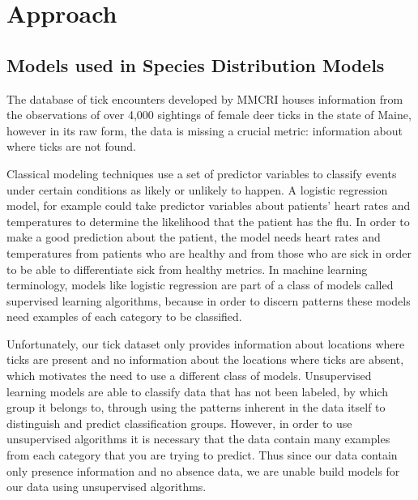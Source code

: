
\chapter{Approach} %

\label{Chapter2} 



\section{Models used in Species Distribution Models}
\noindent The database of tick encounters developed by MMCRI houses information from the observations of over 4,000 sightings of female deer ticks in the state of Maine, however in its raw form, the data is missing a crucial metric: information about where ticks are not found. \newline

\noindent Classical modeling techniques use a set of predictor variables to classify events under certain conditions as likely or unlikely to happen. A logistic regression model, for example could take predictor variables about patients' heart rates and temperatures to determine the likelihood that the patient has the flu. In order to make a good prediction about the patient, the model needs heart rates and temperatures from patients who are healthy and from those who are sick in order to be able to differentiate sick from healthy metrics. In machine learning terminology, models like logistic regression are part of a class of models called supervised learning algorithms, because in order to discern patterns these models need examples of each category to be classified. \newline

\noindent Unfortunately, our tick dataset only provides information about locations where ticks are present and no information about the locations where ticks are absent, which motivates the need to use a different class of models. Unsupervised learning models are able to classify data that has not been labeled, by which group it belongs to, through using the patterns inherent in the data itself to distinguish and predict classification groups. However, in order to use unsupervised algorithms it is necessary that the data contain many examples from each category that you are trying to predict. Thus since our data contain only presence information and no absence data, we are unable build models for our data using unsupervised algorithms. \newline


